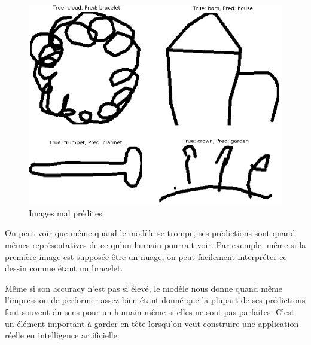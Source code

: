 \begin{figure}[h]
	\includegraphics[width=\linewidth]{images/combo_rate.png} %
	\caption{Images mal prédites} %
	\label{comborate} 
\end{figure}

On peut voir que même quand le modèle se trompe, ses prédictions sont quand mêmes représentatives de ce qu'un humain pourrait voir. Par exemple, même si la première image est supposée être un nuage, on peut facilement interpréter ce dessin comme étant un bracelet. 


Même si son accuracy n'est pas si élevé, le modèle nous donne quand même l'impression de performer assez bien étant donné que la plupart de ses prédictions font souvent du sens pour un humain même si elles ne sont pas parfaites. C'est un élément important à garder en tête lorsqu'on veut construire une application réelle en intelligence artificielle.  